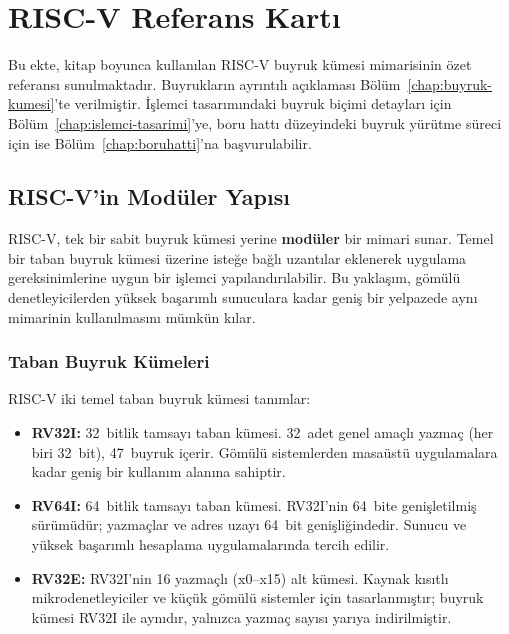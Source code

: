 \chapter{RISC-V Referans Kartı}
\label{app:risc-v-referans}

Bu ekte, kitap boyunca kullanılan RISC-V buyruk kümesi mimarisinin özet referansı sunulmaktadır. Buyrukların ayrıntılı açıklaması Bölüm~\ref{chap:buyruk-kumesi}'te verilmiştir. İşlemci tasarımındaki buyruk biçimi detayları için Bölüm~\ref{chap:islemci-tasarimi}'ye, boru hattı düzeyindeki buyruk yürütme süreci için ise Bölüm~\ref{chap:boruhatti}'na başvurulabilir.

\section{RISC-V'in Modüler Yapısı}
\label{sec:ekc-moduler-yapi}

RISC-V, tek bir sabit buyruk kümesi yerine \textbf{modüler} bir mimari sunar. Temel bir taban buyruk kümesi üzerine isteğe bağlı uzantılar eklenerek uygulama gereksinimlerine uygun bir işlemci yapılandırılabilir. Bu yaklaşım, gömülü denetleyicilerden yüksek başarımlı sunuculara kadar geniş bir yelpazede aynı mimarinin kullanılmasını mümkün kılar.

\subsection{Taban Buyruk Kümeleri}

RISC-V iki temel taban buyruk kümesi tanımlar:

\begin{itemize}
    \item \textbf{RV32I:} 32~bitlik tamsayı taban kümesi. 32~adet genel amaçlı yazmaç (her biri 32~bit), 47~buyruk içerir. Gömülü sistemlerden masaüstü uygulamalara kadar geniş bir kullanım alanına sahiptir.
    \item \textbf{RV64I:} 64~bitlik tamsayı taban kümesi. RV32I'nin 64~bite genişletilmiş sürümüdür; yazmaçlar ve adres uzayı 64~bit genişliğindedir. Sunucu ve yüksek başarımlı hesaplama uygulamalarında tercih edilir.
    \item \textbf{RV32E:} RV32I'nin 16 yazmaçlı (x0--x15) alt kümesi. Kaynak kısıtlı mikrodenetleyiciler ve küçük gömülü sistemler için tasarlanmıştır; buyruk kümesi RV32I ile aynıdır, yalnızca yazmaç sayısı yarıya indirilmiştir.
\end{itemize}

